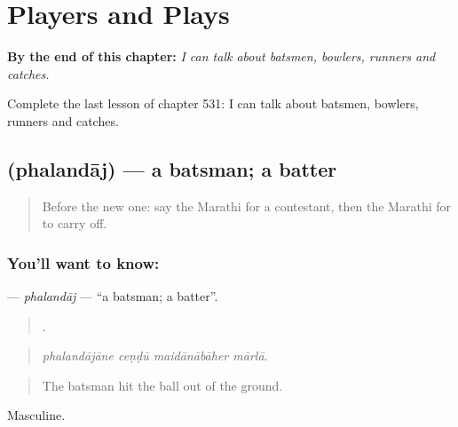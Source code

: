 
\chapter{Players and Plays}
\label{ch:mr-players-and-plays}

\begin{chapteropening}
\textbf{By the end of this chapter:} \emph{I can talk about batsmen, bowlers, runners and catches.}

Complete the last lesson of chapter 531: I can talk about batsmen, bowlers, runners and catches.
\end{chapteropening}

\section[\texorpdfstring{\mr{फलंदाज} (phalandāj)}{फलंदाज (phalandāj)}]{ (phalandāj) — a batsman; a batter}

\label{lesson:MR-C531-phalandaj}



\begin{quote}
Before the new one: say the Marathi for a contestant, then the Marathi for to carry off.
\end{quote}

\subsection*{You'll want to know: }
\textbf{} — \emph{phalandāj} — \textquotedblleft{}a batsman; a batter\textquotedblright{}.

\begin{quote}
   .
\end{quote}

\begin{quote}
\emph{phalandājāne ceṇḍū maidānābāher mārlā.}
\end{quote}

\begin{quote}
The batsman hit the ball out of the ground.
\end{quote}

Masculine.

